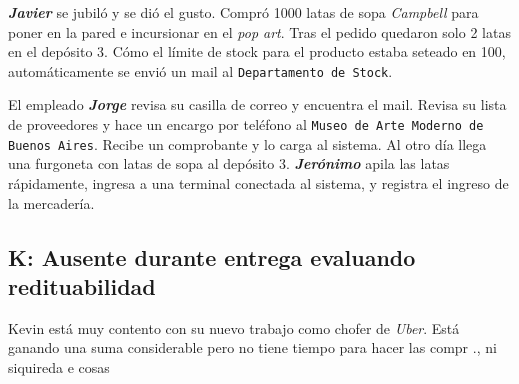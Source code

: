 \textbf{\emph{Javier}} se jubiló y se dió el gusto. Compró 1000 latas de sopa
\textit{Campbell} para poner en la pared e incursionar en el \textit{pop art}.
Tras el pedido quedaron solo 2 latas en el depósito 3. Cómo el límite de stock
para el producto estaba seteado en 100, automáticamente se envió un mail al
\texttt{Departamento de Stock}.

El empleado \textbf{\emph{Jorge}} revisa su casilla de correo y encuentra el
mail. Revisa su lista de proveedores y hace un encargo por teléfono al
\texttt{Museo de Arte Moderno de Buenos Aires}. Recibe un comprobante y lo
carga al sistema. Al otro día llega una furgoneta con latas de sopa al
depósito 3. \textbf{\emph{Jerónimo}} apila las latas rápidamente, ingresa a
una terminal conectada al sistema, y registra el ingreso de la mercadería.

\subsection{K: Ausente durante entrega evaluando redituabilidad}

Kevin está muy contento con su nuevo trabajo como chofer de \textit{Uber}. Está
ganando una suma considerable pero no tiene tiempo para hacer las compr
., ni
siquireda e cosas
